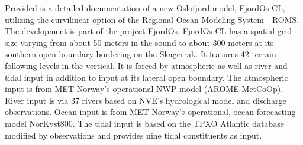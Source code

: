 Provided is a detailed documentation of a new Oslofjord model, FjordOs CL, utilizing the curvilinear option of the Regional Ocean Modeling System - ROMS. The development is part of the project FjordOs. FjordOs CL has a spatial grid size varying from about 50 meters in the {\DR} sound to about 300 meters at its southern open boundary bordering on the Skagerrak. It features 42 terrain-following levels in the vertical. It is forced by atmospheric as well as river and tidal input in addition to input at its lateral open boundary. The atmospheric input is from MET Norway's operational NWP model (AROME-MetCoOp). River input is via 37 rivers based on NVE's hydrological model and discharge observations. Ocean input is from MET Norway's operational, ocean forecasting model NorKyst800. The tidal input is based on the TPXO Atlantic database modified by observations and provides nine tidal constituents as input.
